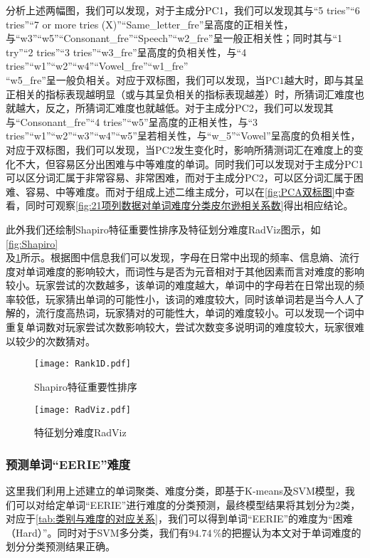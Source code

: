 \documentclass{MathModeling}
\begin{document}
	分析上述两幅图，我们可以发现，对于主成分PC1，我们可以发现其与“5 tries”“6 tries”“7 or more tries (X)”“Same\_letter\_fre”呈高度的正相关性，与“w3”“w5”“Consonant\_fre”“Speech”“w2\_fre”呈一般正相关性；同时其与“1 try”“2 tries”“3 tries”“w3\_fre”呈高度的负相关性，与“4 tries”“w1”“w2”“w4”“Vowel\_fre”“w1\_fre”\\“w5\_fre”呈一般负相关。对应于双标图，我们可以发现，当PC1越大时，即与其呈正相关的指标表现越明显（或与其呈负相关的指标表现越差）时，所猜词汇难度也就越大，反之，所猜词汇难度也就越低。对于主成分PC2，我们可以发现其与“Consonant\_fre”“4 tries”“w5”呈高度的正相关性，与“3 tries”“w1”“w2”“w3”“w4”“w5”呈若相关性，与“w\_5”“Vowel”呈高度的负相关性，对应于双标图，我们可以发现，当PC2发生变化时，影响所猜测词汇在难度上的变化不大，但容易区分出困难与中等难度的单词。同时我们可以发现对于主成分PC1可以区分词汇属于非常容易、非常困难，而对于主成分PC2，可以区分词汇属于困难、容易、中等难度。而对于组成上述二维主成分，可以在\textcolor{blue}{\cref{fig:PCA双标图}}中查看，同时可观察\textcolor{blue}{\cref{fig:21项列数据对单词难度分类皮尔逊相关系数}}得出相应结论。

	此外我们还绘制Shapiro特征重要性排序及特征划分难度RadViz图示，如\textcolor{blue}{\cref{fig:Shapiro}}\\
	及\textcolor{blue}{\cref{fig:RadViz}}所示。根据图中信息我们可以发现，字母在日常中出现的频率、信息熵、流行度对单词难度的影响较大，而词性与是否为元音相对于其他因素而言对难度的影响较小。玩家尝试的次数越多，该单词的难度越大，单词中的字母若在日常出现的频率较低，玩家猜出单词的可能性小，该词的难度较大，同时该单词若是当今人人了解的，流行度高热词，玩家猜对的可能性大，单词的难度较小。可以发现一个词中重复单词数对玩家尝试次数影响较大，尝试次数变多说明词的难度较大，玩家很难以较少的次数猜对。
	\begin{figure}[htbp]
		\centering
		\begin{minipage}{0.48\linewidth}
			\centering
			\texttt{[image: Rank1D.pdf]}
			\caption{Shapiro特征重要性排序}
			\label{fig:Shapiro}
		\end{minipage}
		\begin{minipage}{0.48\linewidth}
			\centering
			\texttt{[image: RadViz.pdf]}
			\caption{特征划分难度RadViz}
			\label{fig:RadViz}
		\end{minipage}
	\end{figure}

	\subsubsection{预测单词“EERIE”难度}
	这里我们利用上述建立的单词聚类、难度分类，即基于K-means及SVM模型，我们可以对给定单词“EERIE”进行难度的分类预测，最终模型结果将其划分为$2$类，对应于\textcolor{blue}{\cref{tab:类别与难度的对应关系}}，我们可以得到单词“EERIE”的难度为“困难（Hard）”。同时对于SVM多分类，我们有$94.74\,\%$的把握认为本文对于单词难度的划分分类预测结果正确。
	
\end{document}
